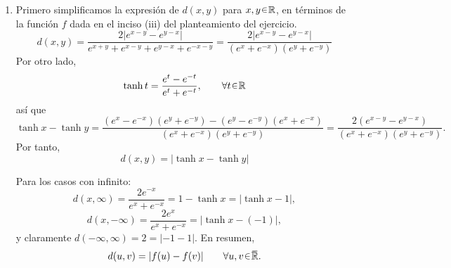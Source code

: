 \begin{sol}
\begin{enumerate}[label = (\roman*)]
\begin{itemize}
    \item Para la intersección finita, basta probar que la intersección de dos elementos de $\mathcal{B}$ es abierta (gracias a que la intersección se distribuye respecto a la unión arbitraria). Analicemos todos los casos posibles:
    \begin{itemize}
        \item $(a,b) \cap (c,d) = (\max\{a,c\}, \min\{b,d\})$ (intervalo abierto o vacío).
        \item $(a,\infty] \cap (c,\infty] = (\max\{a,c\}, \infty]$.
        \item $[-\infty,b) \cap [-\infty,d) = [-\infty, \min\{b,d\})$.
        \item $(a,\infty] \cap [-\infty,b) = (a,b)$ si $a<b$; vacío si $a\ge b$.
    \end{itemize}
    En cualquier caso, la intersección finita de abiertos es abierta. Así que los axiomas de topología se satisfacen.
\end{itemize}

\item %
Primero simplificamos la expresión de $d(x,y)$ para $x,y\en\mathbb{R}$, en términos de la función $f$ dada en el inciso (iii) del planteamiento del ejercicio.
\[
d(x,y)%
=\frac{2|e^{x-y}-e^{y-x}|}{e^{x+y}+e^{x-y}+e^{y-x}+e^{-x-y}}%
=\frac{2|e^{x-y}-e^{y-x}|}{(e^x+e^{-x})(e^y+e^{-y})}
\]
Por otro lado,
\[
\tanh t = \frac{e^{t}-e^{-t}}{e^{t}+e^{-t}},\qquad\forall t\en\mathbb{R}
\]
así que
\[
\tanh x - \tanh y%
= \frac{(e^{x}-e^{-x})(e^{y}+e^{-y})-(e^{y}-e^{-y})(e^{x}+e^{-x})}{(e^{x}+e^{-x})(e^{y}+e^{-y})}%
= \frac{2(e^{x-y}-e^{y-x})}{(e^{x}+e^{-x})(e^{y}+e^{-y})}.
\]
Por tanto,
\[
d(x,y) = |\tanh x - \tanh y|
\]

Para los casos con infinito:
\[
d(x,\infty)=\frac{2e^{-x}}{e^x+e^{-x}} = 1-\tanh x = |\tanh x - 1|,
\]
\[
d(x,-\infty)=\frac{2e^{x}}{e^x+e^{-x}} = |\tanh x - (-1)|,
\]
y claramente $d(-\infty,\infty)=2=|-1-1|$. En resumen,
\begin{equation}\label{eq:isome}
d(u,v)=|f(u)-f(v)| \qquad \forall u,v\en\ubar{\mathbb{R}}.
\end{equation}


\end{enumerate}
\end{sol}
